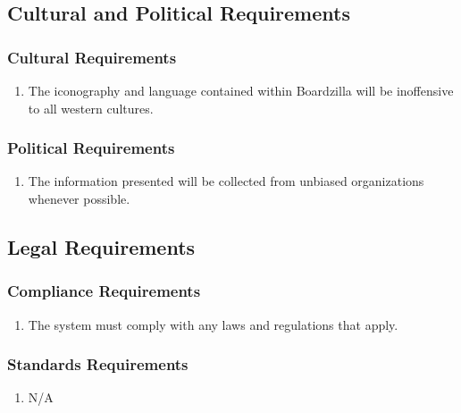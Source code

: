 \documentclass[]{article}
\begin{document}

\subsection{Cultural and Political Requirements}
\label{sub:cultural_and_political_requirements}

\subsubsection{Cultural Requirements}
\label{ssub:cultural_requirements}
\begin{enumerate}[{CP}1. ]
  \item The iconography and language contained within Boardzilla will be inoffensive to all western cultures.
\end{enumerate}

\subsubsection{Political Requirements}
\label{ssub:political_requirements}
\begin{enumerate}[{CP}1. ]
  \item The information presented will be collected from unbiased organizations whenever possible.
\end{enumerate}


\subsection{Legal Requirements}
\label{sub:legal_requirements}

\subsubsection{Compliance Requirements}
\label{ssub:compliance_requirements}
\begin{enumerate}[{LR}1. ]
  \item The system must comply with any laws and regulations that apply.
\end{enumerate}

\subsubsection{Standards Requirements}
\label{ssub:standards_requirements}
\begin{enumerate}[{LR}1. ]
  \item N/A
\end{enumerate}
\end{document}
